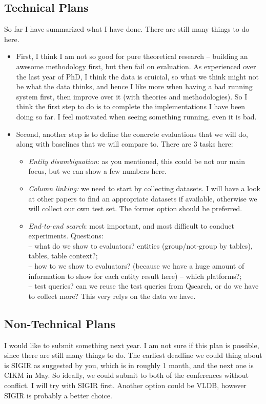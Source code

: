 \documentclass{article}
\begin{document}
\subsection{Technical Plans}
So far I have summarized what I have done. There are still many things to do here.
\begin{itemize}
\item First, I think I am not so good for pure theoretical research -- building an awesome methodology first, but then fail on evaluation. As experienced over the last year of PhD, I think the data is cruicial, so what we think might not be what the data thinks, and hence I like more when having a bad running system first, then improve over it (with theories and methodologies). So I think the first step to do is to complete the implementations I have been doing so far. I feel motivated when seeing something running, even it is bad.

\item Second, another step is to define the concrete evaluations that we will do, along with baselines that we will compare to. There are 3 tasks here:
\begin{itemize}
\item \textit{Entity disambiguation}:  as you mentioned, this could be not our main focus, but we can show a few numbers here.
\item \textit{Column linking:} we need to start by collecting datasets. I will have a look at other papers to find an appropriate datasets if available, otherwise we will collect our own test set. The former option should be preferred.
\item \textit{End-to-end search}: most important, and most difficult to conduct experiments. Questions: 
\\ -- what do we show to evaluators? entities (group/not-group by tables), tables, table context?;\\ -- how to we show to evaluators? (because we have a huge amount of information to show for each entity result here) -- which platforms?;\\ -- test queries? can we reuse the test queries from Qsearch, or do we have to collect more? This very relys on the data we have. 
\end{itemize}

\end{itemize}
\subsection{Non-Technical Plans}
I would like to submit something next year. I am not sure if this plan is possible, since there are still many things to do. The earliest deadline we could thing about is SIGIR as suggested by you, which is in roughly 1 month, and the next one is CIKM in May. So ideally, we could submit to both of the conferences without conflict. I will try with SIGIR first. Another option could be VLDB, however SIGIR is probably a better choice.
\end{document}
